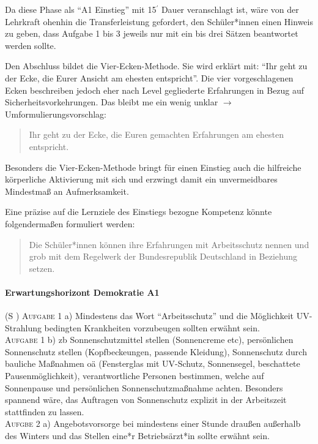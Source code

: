 Da diese Phase als \enquote{A1 Einstieg} mit 15$^\prime$ Dauer veranschlagt ist, wäre von der Lehrkraft ohenhin die Transferleistung gefordert, den Schüler*innen einen Hinweis zu geben, dass Aufgabe 1 bis 3 jeweils nur mit ein bis drei Sätzen beantwortet werden sollte.

Den Abschluss bildet die Vier-Ecken-Methode. Sie wird erklärt mit: \enquote{Ihr geht zu der Ecke, die Eurer Ansicht am ehesten entspricht}.
Die vier vorgeschlagenen Ecken beschreiben jedoch eher nach Level gegliederte Erfahrungen in Bezug auf Sicherheitsvorkehrungen. Das bleibt \gls{me} ein wenig unklar $\rightarrow$ Umformulierungsvorschlag:
\begin{quote}
    Ihr geht zu der Ecke, die Euren gemachten Erfahrungen am ehesten entspricht. 
\end{quote}

Besonders die Vier-Ecken-Methode bringt für einen Einstieg auch die hilfreiche körperliche Aktivierung mit sich und erzwingt damit ein unvermeidbares Mindestmaß an Aufmerksamkeit.  

Eine präzise auf die Lernziele des Einstiegs bezogne Kompetenz könnte folgendermaßen formuliert werden:
\begin{quote}
    Die Schüler*innen können ihre Erfahrungen mit Arbeitsschutz nennen und grob mit dem Regelwerk der Bundesrepublik Deutschland in Beziehung setzen. 
\end{quote}


\paragraph{Erwartungshorizont Demokratie A1} (\gls{S} \pageref{DEMOKRATIE-A1})
\textsc{Aufgabe 1} a) \quad
Mindestens das Wort \enquote{Arbeitsschutz} und die Möglichkeit UV-Strahlung bedingten Krankheiten vorzubeugen sollten erwähnt sein. 
\\

\textsc{Aufgabe 1} b) \quad
\Gls{zb} Sonnenschutzmittel stellen (Sonnencreme \gls{etc}), persönlichen Sonnenschutz stellen (Kopfbeckeungen, passende Kleidung), Sonnenschutz durch bauliche Maßnahmen \gls{oä} (Fensterglas mit UV-Schutz, Sonnensegel, beschattete Pausenmöglichkeit), verantwortliche Personen bestimmen, welche auf Sonnenpause und persönlichen Sonnenschutzmaßnahme achten. 
Besonders spannend wäre, das Auftragen von Sonnenschutz explizit in der Arbeitszeit stattfinden zu lassen. 
\\

\textsc{Aufgbe 2} a) \quad
Angebotsvorsorge bei mindestens einer Stunde draußen außerhalb des Winters und das Stellen eine*r Betriebsärzt*in sollte erwähnt sein. 
\\

